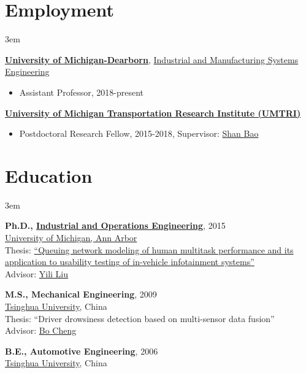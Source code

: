 \documentclass[11pt]{article}
\newenvironment{main}
{\begin{adjustwidth}{3em}{}}
{\end{adjustwidth}}
\begin{document}
\section*{Employment}
\begin{main}

\href{https://umdearborn.edu/}{\textbf{University of Michigan-Dearborn}},
\href{https://umdearborn.edu/cecs/departments/industrial-and-manufacturing-systems-engineering}{Industrial and Manufacturing Systems Engineering}

\begin{itemize}
    \item[] Assistant Professor, 2018-present
\end{itemize}

\href{http://www.umtri.umich.edu/}{\textbf{University of Michigan Transportation Research Institute (UMTRI)}}

\begin{itemize}
    \item[] Postdoctoral Research Fellow, 2015-2018, Supervisor: \href{https://sites.google.com/umich.edu/hfet-lab/people}{Shan Bao}
\end{itemize}


\end{main}
\section*{Education}
\begin{main}

\textbf{Ph.D., \href{https://ioe.engin.umich.edu/}{Industrial and Operations Engineering}}, 2015\\
\href{https://umich.edu/}{University of Michigan, Ann Arbor}\\
Thesis: \href{https://deepblue.lib.umich.edu/handle/2027.42/113590}{``Queuing network modeling of human multitask performance and its application to usability testing of in-vehicle infotainment systems''}\\
Advisor: \href{https://ioe.engin.umich.edu/people/yili-liu/}{Yili Liu}

\textbf{M.S., Mechanical Engineering}, 2009\\
\href{https://www.tsinghua.edu.cn/en/index.htm}{Tsinghua University}, China\\
Thesis: ``Driver drowsiness detection based on multi-sensor data fusion''\\
Advisor: \href{http://www.svm.tsinghua.edu.cn/essay/80/1799.html}{Bo Cheng}

\textbf{B.E., Automotive Engineering}, 2006\\
\href{https://www.tsinghua.edu.cn/en/index.htm}{Tsinghua University}, China


\end{main}
\end{document}
